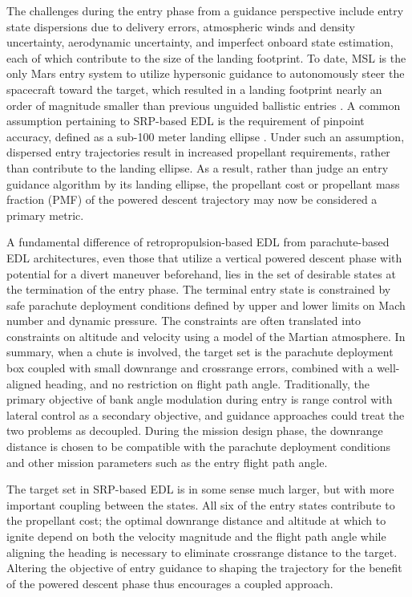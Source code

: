 \documentclass[letterpaper, preprint, paper,11pt]{AAS}
\begin{document}
The challenges during the entry phase from a guidance perspective include entry state dispersions due to delivery errors, atmospheric winds and density uncertainty, aerodynamic uncertainty, and imperfect onboard state estimation, each of which contribute to the size of the landing footprint. To date, MSL is the only Mars entry system to utilize hypersonic guidance to autonomously steer the spacecraft toward the target, which resulted in a landing footprint nearly an order of magnitude smaller than previous unguided ballistic entries \cite{BraunMarsEDL}. A common assumption pertaining to SRP-based EDL is the requirement of pinpoint accuracy, defined as a sub-100 meter landing ellipse \cite{GNC_Pinpoint}. Under such an assumption, dispersed entry trajectories result in increased propellant requirements, rather than contribute to the landing ellipse. As a result, rather than judge an entry guidance algorithm by its landing ellipse, the propellant cost or propellant mass fraction (PMF) of the powered descent trajectory may now be considered a primary metric.

A fundamental difference of retropropulsion-based EDL from parachute-based EDL architectures, even those that utilize a vertical powered descent phase with potential for a divert maneuver beforehand, lies in the set of desirable states at the termination of the entry phase. The terminal entry state is constrained by safe parachute deployment conditions defined by upper and lower limits on Mach number and dynamic pressure. The constraints are often translated into constraints on altitude and velocity using a model of the Martian atmosphere. In summary, when a chute is involved, the target set is the parachute deployment box coupled with small downrange and crossrange errors, combined with a well-aligned heading, and no restriction on flight path angle. Traditionally, the primary objective of bank angle modulation during entry is range control with lateral control as a secondary objective, and guidance approaches could treat the two problems as decoupled. During the mission design phase, the downrange distance is chosen to be compatible with the parachute deployment conditions and other mission parameters such as the entry flight path angle.

The target set in SRP-based EDL is in some sense much larger, but with more important coupling between the states. All six of the entry states contribute to the propellant cost; the optimal downrange distance and altitude at which to ignite depend on both the velocity magnitude and the flight path angle while aligning the heading is necessary to eliminate crossrange distance to the target. Altering the objective of entry guidance to shaping the trajectory for the benefit of the powered descent phase thus encourages a coupled approach. 
\end{document}
